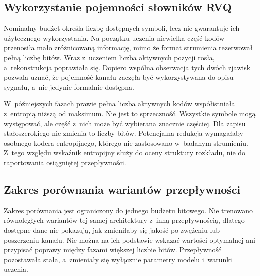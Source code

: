 \subsection{Wykorzystanie pojemności słowników RVQ}
\label{subsec:wykorzystanie-pojemnosci-rvq}

Nominalny budżet określa liczbę dostępnych symboli, lecz nie gwarantuje ich użytecznego wykorzystania. Na początku uczenia niewielka część kodów przenosiła mało zróżnicowaną informację, mimo że format strumienia rezerwował pełną liczbę bitów. Wraz z~uczeniem liczba aktywnych pozycji rosła, a~rekonstrukcja poprawiała się. Dopiero wspólna obserwacja tych dwóch zjawisk pozwala uznać, że pojemność kanału zaczęła być wykorzystywana do opisu sygnału, a~nie jedynie formalnie dostępna.

W~późniejszych fazach prawie pełna liczba aktywnych kodów współistniała z~entropią niższą od maksimum. Nie jest to sprzeczność. Wszystkie symbole mogą występować, ale część z~nich może być wybierana znacznie częściej. Dla zapisu stałoszerokiego nie zmienia to liczby bitów. Potencjalna redukcja wymagałaby osobnego kodera entropijnego, którego nie zastosowano w~badanym strumieniu. Z~tego względu wskaźnik entropijny służy do oceny struktury rozkładu, nie do raportowania osiągniętej przepływności.

\clearpage
\subsection{Zakres porównania wariantów przepływności}
\label{subsec:zakres-porownania-przeplywnosci}

Zakres porównania jest ograniczony do jednego budżetu bitowego. Nie trenowano równoległych wariantów tej samej architektury z~inną przepływnością, dlatego dostępne dane nie pokazują, jak zmieniłaby się jakość po zwężeniu lub poszerzeniu kanału. Nie można na ich podstawie wskazać wartości optymalnej ani przypisać poprawy między fazami większej liczbie bitów. Przepływność pozostawała stała, a~zmieniały się wyłącznie parametry modelu i~warunki uczenia.

